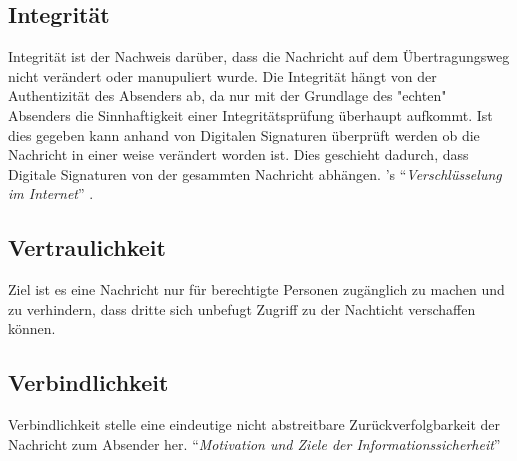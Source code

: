 \subsection{Integrität}

Integrität ist der Nachweis darüber, dass die Nachricht auf dem Übertragungsweg nicht verändert oder manupuliert wurde.
Die Integrität hängt von der Authentizität des Absenders ab, da nur mit der Grundlage des "echten" Absenders die Sinnhaftigkeit einer Integritätsprüfung überhaupt aufkommt.
Ist dies gegeben kann anhand von Digitalen Signaturen überprüft werden ob die Nachricht in einer weise verändert worden ist.
Dies geschieht dadurch, dass Digitale Signaturen von der gesammten Nachricht abhängen.
\citeauthor{richter}'s ``\emph{Verschlüsselung im Internet}'' \citep{richter}.


\subsection{Vertraulichkeit}
Ziel ist es eine Nachricht nur für berechtigte Personen zugänglich zu machen und zu verhindern, dass dritte sich unbefugt Zugriff zu der Nachticht verschaffen können.


\subsection{Verbindlichkeit}
Verbindlichkeit stelle eine eindeutige nicht abstreitbare Zurückverfolgbarkeit der Nachricht zum Absender her.
\citeauthor{wiki:itsec} ``\emph{Motivation und Ziele der Informationssicherheit}'' \citep{wiki:itsec}